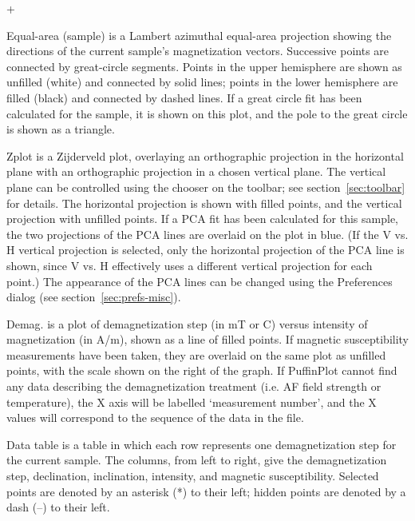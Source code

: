 \documentclass[a4paper,british]{article}
\newcommand{\menuitemlabel}[1]{%
\mbox{\textsf{#1}}\hfil}
\newenvironment{menuitemlist}%
{\begin{list}{}{%
\renewcommand{\makelabel}{\menuitemlabel}%
\setlength{\labelwidth}{35pt}%
\setlength{\leftmargin}%
             {\labelwidth+\labelsep}}}%
{\end{list}}
\newcommand{\ppcmd}[1]{\textsf{#1}} %
\newcommand{\caps}[1]{\MakeTextUppercase{#1}} %
\begin{document}
\begin{menuitemlist}

\item[Equal-area (sample)] is a Lambert azimuthal equal-area projection
  showing the directions of the current sample's magnetization vectors.
  Successive points are connected by great-circle segments. Points in the
  upper hemisphere are shown as unfilled (white) and connected by solid
  lines; points in the lower hemisphere are filled (black) and connected by
  dashed lines. If a great circle fit has been calculated for the sample, it
  is shown on this plot, and the pole to the great circle is shown as a
  triangle.

\item[Zplot] is a Zijderveld plot, overlaying an orthographic projection in
  the horizontal plane with an orthographic projection in a chosen vertical
  plane. The vertical plane can be controlled using the chooser on the
  toolbar; see section~\ref{sec:toolbar} for details. The horizontal
  projection is shown with filled points, and the vertical projection with
  unfilled points. If a \caps{pca} fit has been calculated for this sample,
  the two projections of the \caps{pca} lines are overlaid on the plot in
  blue. (If the \ppcmd{V vs. H} vertical projection is selected, only the
  horizontal projection of the \caps{pca} line is shown, since \ppcmd{V vs.
    H} effectively uses a different vertical projection for each point.) The
  appearance of the \caps{pca} lines can be changed using the Preferences dialog
  (see section~\ref{sec:prefs-misc}).

\item[Demag.] is a plot of demagnetization step (in mT or \textdegree C)
  versus intensity of magnetization (in A/m), shown as a line of filled
  points. If magnetic susceptibility measurements have been taken, they are
  overlaid on the same plot as unfilled points, with the scale shown on the
  right of the graph. If PuffinPlot cannot find any data describing the
  demagnetization treatment (i.e. AF field strength or temperature),
  the X axis will be labelled `measurement number', and the X values
  will correspond to the sequence of the data in the file.

\item[Data table] is a table in which each row represents one demagnetization
  step for the current sample. The columns, from left to right, give the
  demagnetization step, declination, inclination, intensity, and magnetic
  susceptibility. Selected points are denoted by an asterisk (*) to their
  left; hidden points are denoted by a dash (--) to their left.


\end{menuitemlist}
\end{document}

